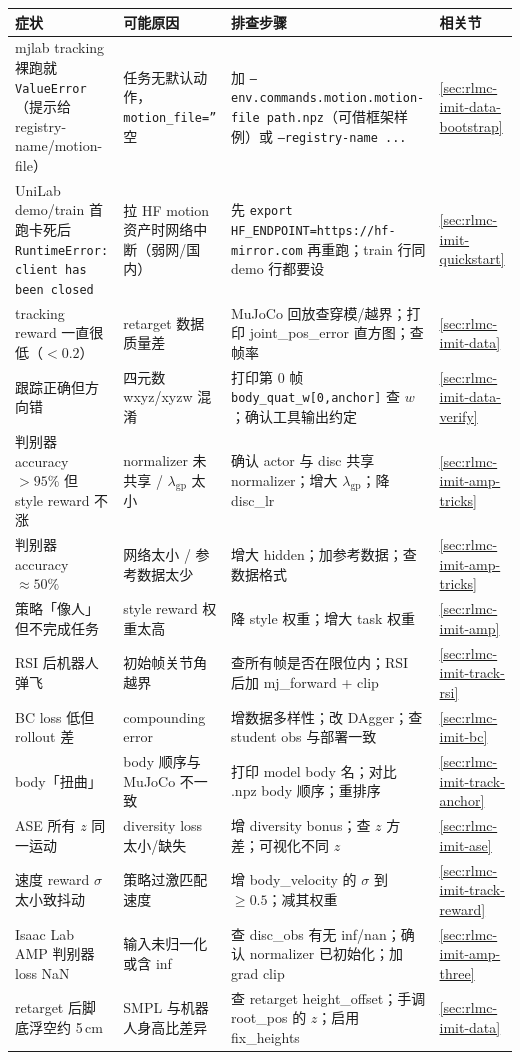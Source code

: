 \begin{center}
\small
\begin{tabular}{@{}p{3.3cm}p{3.0cm}p{4.5cm}l@{}}
\toprule
症状 & 可能原因 & 排查步骤 & 相关节 \\
\midrule
mjlab tracking 裸跑就 \texttt{ValueError}（提示给 registry-name/motion-file） & 任务无默认动作，\texttt{motion\_file=''} 空 & 加 \texttt{--env.\allowbreak commands.\allowbreak motion.\allowbreak motion-file path.\allowbreak npz}（可借框架样例）或 \texttt{--registry-name ...} & \cref{sec:rlmc-imit-data-bootstrap} \\
UniLab demo/train 首跑卡死后 \texttt{RuntimeError: client has been closed} & 拉 HF motion 资产时网络中断（弱网/国内） & 先 \texttt{export HF\_ENDPOINT=https:/\allowbreak /\allowbreak hf-mirror.\allowbreak com} 再重跑；train 行同 demo 行都要设 & \cref{sec:rlmc-imit-quickstart} \\
tracking reward 一直很低（$<0.2$） & retarget 数据质量差 & MuJoCo 回放查穿模/越界；打印 joint\_pos\_error 直方图；查帧率 & \cref{sec:rlmc-imit-data} \\
跟踪正确但方向错 & 四元数 wxyz/xyzw 混淆 & 打印第 0 帧 \texttt{body\_quat\_w[0,anchor]} 查 $w$；确认工具输出约定 & \cref{sec:rlmc-imit-data-verify} \\
判别器 accuracy $>95\%$ 但 style reward 不涨 & normalizer 未共享 / $\lambda_{\text{gp}}$ 太小 & 确认 actor 与 disc 共享 normalizer；增大 $\lambda_{\text{gp}}$；降 disc\_lr & \cref{sec:rlmc-imit-amp-tricks} \\
判别器 accuracy $\approx50\%$ & 网络太小 / 参考数据太少 & 增大 hidden；加参考数据；查数据格式 & \cref{sec:rlmc-imit-amp-tricks} \\
策略「像人」但不完成任务 & style reward 权重太高 & 降 style 权重；增大 task 权重 & \cref{sec:rlmc-imit-amp} \\
RSI 后机器人弹飞 & 初始帧关节角越界 & 查所有帧是否在限位内；RSI 后加 mj\_forward + clip & \cref{sec:rlmc-imit-track-rsi} \\
BC loss 低但 rollout 差 & compounding error & 增数据多样性；改 DAgger；查 student obs 与部署一致 & \cref{sec:rlmc-imit-bc} \\
body「扭曲」 & body 顺序与 MuJoCo 不一致 & 打印 model body 名；对比 .npz body 顺序；重排序 & \cref{sec:rlmc-imit-track-anchor} \\
ASE 所有 $z$ 同一运动 & diversity loss 太小/缺失 & 增 diversity bonus；查 $z$ 方差；可视化不同 $z$ & \cref{sec:rlmc-imit-ase} \\
速度 reward $\sigma$ 太小致抖动 & 策略过激匹配速度 & 增 body\_velocity 的 $\sigma$ 到 $\ge0.5$；减其权重 & \cref{sec:rlmc-imit-track-reward} \\
Isaac Lab AMP 判别器 loss NaN & 输入未归一化或含 inf & 查 disc\_obs 有无 inf/nan；确认 normalizer 已初始化；加 grad clip & \cref{sec:rlmc-imit-amp-three} \\
retarget 后脚底浮空约 5\,cm & SMPL 与机器人身高比差异 & 查 retarget height\_offset；手调 root\_pos 的 $z$；启用 fix\_heights & \cref{sec:rlmc-imit-data} \\
\bottomrule
\end{tabular}
\end{center}

